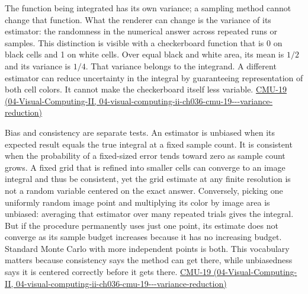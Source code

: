 The function being integrated has its own variance; a sampling method cannot change that function. What the renderer can change is the variance of its estimator: the randomness in the numerical answer across repeated runs or samples. This distinction is visible with a checkerboard function that is 0 on black cells and 1 on white cells. Over equal black and white area, its mean is \(1/2\) and its variance is \(1/4\). That variance belongs to the integrand. A different estimator can reduce uncertainty in the integral by guaranteeing representation of both cell colors. It cannot make the checkerboard itself less variable. \href{../04-Visual-Computing-II/main.pdf\#nameddest=04-visual-computing-ii-ch036-cmu-19---variance-reduction}{CMU-19 (04-Visual-Computing-II, 04-visual-computing-ii-ch036-cmu-19-\/-\/-variance-reduction)}

Bias and consistency are separate tests. An estimator is unbiased when its expected result equals the true integral at a fixed sample count. It is consistent when the probability of a fixed-sized error tends toward zero as sample count grows. A fixed grid that is refined into smaller cells can converge to an image integral and thus be consistent, yet the grid estimate at any finite resolution is not a random variable centered on the exact answer. Conversely, picking one uniformly random image point and multiplying its color by image area is unbiased: averaging that estimator over many repeated trials gives the integral. But if the procedure permanently uses just one point, its estimate does not converge as its sample budget increases because it has no increasing budget. Standard Monte Carlo with more independent points is both. This vocabulary matters because consistency says the method can get there, while unbiasedness says it is centered correctly before it gets there. \href{../04-Visual-Computing-II/main.pdf\#nameddest=04-visual-computing-ii-ch036-cmu-19---variance-reduction}{CMU-19 (04-Visual-Computing-II, 04-visual-computing-ii-ch036-cmu-19-\/-\/-variance-reduction)}


